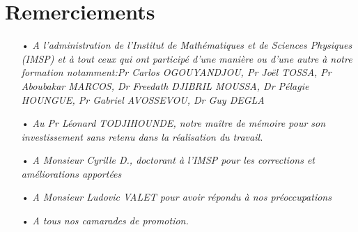 \chapter{Remerciements}

\begin{itemize}
\item[•] \textit{A l'administration de l'Institut de Mathématiques et de Sciences Physiques (IMSP) et à tout ceux qui ont participé d'une manière ou d'une autre à notre formation notamment:Pr Carlos OGOUYANDJOU, Pr Joël TOSSA, Pr Aboubakar MARCOS, Dr Freedath DJIBRIL MOUSSA, Dr Pélagie HOUNGUE, Pr Gabriel AVOSSEVOU, Dr Guy DEGLA}
\item[•] \textit{Au Pr Léonard TODJIHOUNDE, notre maître de mémoire pour son investissement sans retenu dans la réalisation du travail. }
\item[•] \textit{A Monsieur Cyrille D., doctorant à l'IMSP pour les corrections et améliorations apportées}
\item[•] \textit{A Monsieur Ludovic VALET pour avoir répondu à nos préoccupations}
\item[•] \textit{A tous nos camarades de promotion. }
\end{itemize}